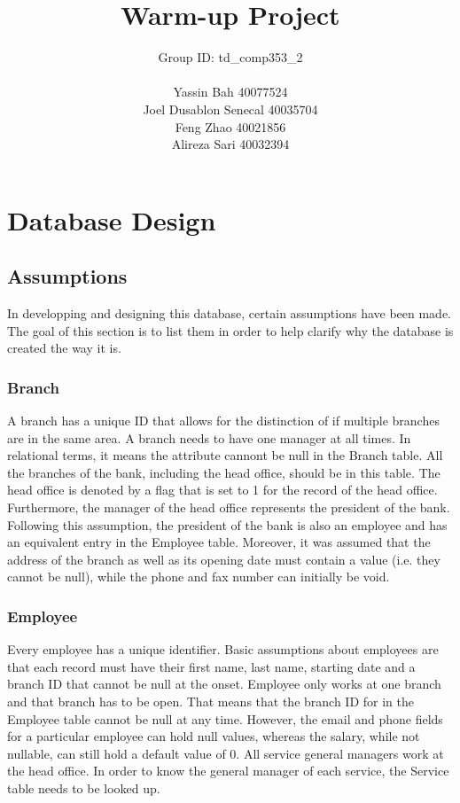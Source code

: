 \documentclass[letterpaper, 12pt]{article}
\title{
  Warm-up Project
  \vspace*{6em}
}
\author{
  Group ID: td\_comp353\_2\\\\
  Yassin Bah 40077524\\
  Joel Dusablon Senecal 40035704\\
  Feng Zhao 40021856\\
  Alireza Sari 40032394\\ \vspace*{5em}
}
\begin{document}
\maketitle
\newpage


\section{Database Design}
\subsection{Assumptions}
In developping and designing this database, certain assumptions have been made.
The goal of this section is to list them in order to help clarify why the database is created the way it is.

\subsubsection{Branch}
A branch has a unique ID that allows for the distinction of if multiple branches are in the same area.
A branch needs to have one manager at all times.
In relational terms, it means the attribute cannont be null in the Branch table.
All the branches of the bank, including the head office, should be in this table.
The head office is denoted by a flag that is set to 1 for the record of the head office.
Furthermore, the manager of the head office represents the president of the bank.
Following this assumption, the president of the bank is also an employee and has an equivalent entry in the Employee table.
Moreover, it was assumed that the address of the branch as well as its opening date must contain a value (i.e. they cannot be null), while the phone and fax number can initially be void.   

\subsubsection{Employee}
Every employee has a unique identifier.
Basic assumptions about employees are that each record must have their first name, last name, starting date and a branch ID that cannot be null at the onset.
Employee only works at one branch and that branch has to be open.
That means that the branch ID for in the Employee table cannot be null at any time.
However, the email and phone fields for a particular employee can hold null values, whereas the salary, while not nullable, can still hold a default value of 0. 
All service general managers work at the head office.
In order to know the general manager of each service, the Service table needs to be looked up.
\end{document}
